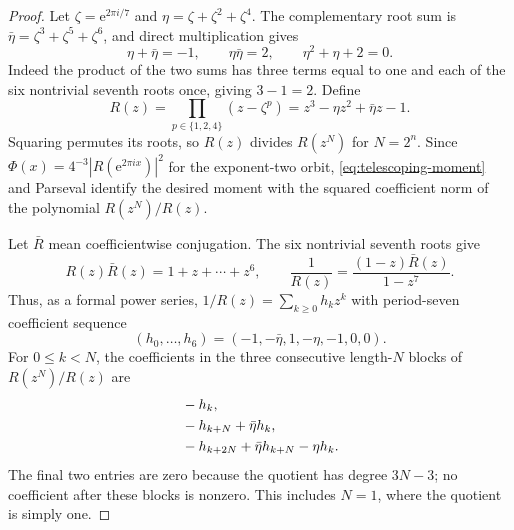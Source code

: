 \documentclass[11pt,a4paper]{article}
\numberwithin{equation}{section}
\theoremstyle{definition}
\theoremstyle{remark}
\newcommand{\ee}{\mathrm e}
\begin{document}
\begin{proof}
Let $\zeta=\ee^{2\pi i/7}$ and $\eta=\zeta+\zeta^2+\zeta^4$.
The complementary root sum is $\bar\eta=\zeta^3+\zeta^5+\zeta^6$,
and direct multiplication gives
\begin{equation}
 \eta+\bar\eta=-1,\qquad \eta\bar\eta=2,
 \qquad \eta^2+\eta+2=0.
 \label{eq:eta-relations}
\end{equation}
Indeed the product of the two sums has three terms equal to one and
each of the six nontrivial seventh roots once, giving $3-1=2$.
Define
\begin{equation}
 R(z)=\prod_{p\in\{1,2,4\}}(z-\zeta^p)
          =z^3-\eta z^2+\bar\eta z-1.
 \label{eq:R}
\end{equation}
Squaring permutes its roots, so $R(z)$ divides $R(z^N)$ for
$N=2^n$. Since
$\Phi(x)=4^{-3}|R(\ee^{2\pi ix})|^2$ for the exponent-two orbit,
\cref{eq:telescoping-moment} and Parseval identify the desired moment
with the squared coefficient norm of the polynomial $R(z^N)/R(z)$.

Let $\bar R$ mean coefficientwise conjugation. The six nontrivial
seventh roots give
\[
 R(z)\bar R(z)=1+z+\cdots+z^6,
 \qquad \frac1{R(z)}=\frac{(1-z)\bar R(z)}{1-z^7}.
\]
Thus, as a formal power series, $1/R(z)=\sum_{k\ge0}h_kz^k$ with
period-seven coefficient sequence
\begin{equation}
 (h_0,\ldots,h_6)=(-1,-\bar\eta,1,-\eta,-1,0,0).
 \label{eq:h-period}
\end{equation}
For $0\le k<N$, the coefficients in the three consecutive length-$N$
blocks of $R(z^N)/R(z)$ are
\begin{align}
 &-h_k,\notag\\
 &-h_{k+N}+\bar\eta h_k,\notag\\
 &-h_{k+2N}+\bar\eta h_{k+N}-\eta h_k.
 \label{eq:three-blocks}
\end{align}
The final two entries are zero because the quotient has degree
$3N-3$; no coefficient after these blocks is nonzero. This includes
$N=1$, where the quotient is simply one.


\end{proof}
\end{document}
